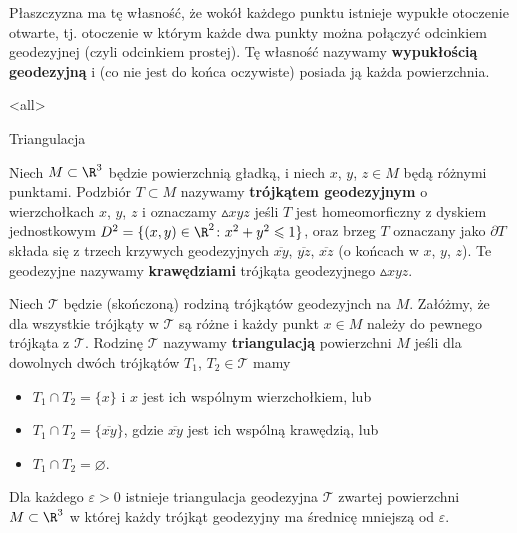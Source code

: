 \begin{frame}

\begin{uwaga}
Płaszczyzna ma tę własność, że wokół każdego punktu istnieje wypukłe otoczenie otwarte, tj. otoczenie w którym każde dwa punkty można połączyć odcinkiem geodezyjnej (czyli odcinkiem prostej). Tę własność nazywamy \textbf{wypukłością geodezyjną} i (co nie jest do końca oczywiste) posiada ją każda powierzchnia.
\end{uwaga}

\end{frame}
\mode<all>{}

\begin{frame}{Triangulacja}
\begin{definicja}
Niech $M\subset \R^3$ będzie powierzchnią gładką, i niech $x$, $y$, $z\in M$ będą różnymi punktami. Podzbiór $T\subset M$ nazywamy \textbf{trójkątem geodezyjnym} o wierzchołkach $x$, $y$, $z$ i oznaczamy $\vartriangle xyz$ jeśli $T$ jest homeomorficzny z dyskiem jednostkowym $D^2=\{(x,y)\in \R^2\colon x^2+y^2\leqslant1\}$, oraz brzeg $T$ oznaczany jako $\partial T$ składa się z trzech krzywych geodezyjnych $\overline{xy}$, $\overline{yz}$, $\overline{xz}$ (o końcach w $x$, $y$, $z$). \pause Te geodezyjne nazywamy \textbf{krawędziami} trójkąta geodezyjnego $\vartriangle xyz$. 
\end{definicja}

\end{frame}
\begin{frame}

\begin{definicja}
Niech $\mathcal{T}$ będzie (skończoną) rodziną trójkątów geodezyjnch na $M$. Załóżmy, że dla wszystkie trójkąty w $\mathcal{T}$ są różne i każdy punkt $x\in M$ należy do pewnego trójkąta z $\mathcal{T}$. Rodzinę $\mathcal{T}$ nazywamy \textbf{triangulacją} powierzchni $M$ jeśli dla dowolnych dwóch trójkątów $T_1$, $T_2\in \mathcal{T}$ mamy 
\begin{itemize}
\item $T_1\cap T_2=\{x\}$ i $x$ jest ich wspólnym wierzchołkiem, lub
\pause\item $T_1\cap T_2=\{\overline{xy}\}$, gdzie $\overline{xy}$ jest ich wspólną krawędzią, lub
\pause\item $T_1\cap T_2=\varnothing$.
\end{itemize}
\end{definicja}

\pause \begin{lemat}
Dla każdego $\varepsilon>0$ istnieje triangulacja geodezyjna $\mathcal{T}$ zwartej powierzchni $M\subset \R^3$ w której każdy trójkąt geodezyjny ma średnicę mniejszą od $\varepsilon$.
\end{lemat}
\end{frame}
